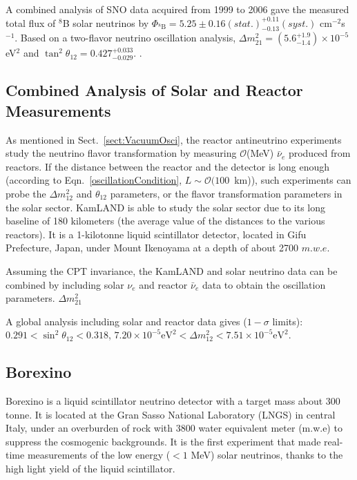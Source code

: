 A combined analysis of SNO data acquired from 1999 to 2006 gave the measured total flux of $^8$B solar neutrinos by $\Phi_{^8\mathrm{B}}=5.25\pm0.16(stat.)^{+0.11}_{-0.13}(syst.)$ cm$^{-2}$s$^{-1}$. Based on a two-flavor neutrino oscillation analysis, $\Delta m^2_{21}=(5.6^{+1.9}_{-1.4})\times 10^{-5}$ eV$^2$ and $\tan^2\theta_{12}=0.427^{+0.033}_{-0.029}$.
\cite{aharmim2013combined}.

\subsection{Combined Analysis of Solar and Reactor Measurements}
As mentioned in Sect.~\ref{sect:VacuumOsci}, the reactor antineutrino experiments study the neutrino flavor transformation by measuring $\mathcal{O}$(MeV) $\bar{\nu}_e$ produced from reactors. If the distance between the reactor and the detector is long enough (according to Eqn.~\ref{oscillationCondition}, $L\sim\mathcal{O}(100$~km)), such experiments can probe the $\Delta m^2_{12}$ and $\theta_{12}$ parameters, or the flavor transformation parameters in the solar sector. KamLAND is able to study the solar sector due to its long baseline of 180 kilometers (the average value of the distances to the various reactors). It is a 1-kilotonne liquid scintillator detector, located in Gifu Prefecture, Japan, under Mount Ikenoyama at a depth of about 2700 $m.w.e$\cite{abe2008precision}. 

Assuming the CPT invariance, the KamLAND and solar neutrino data can be combined by including solar $\nu_e$ and reactor $\bar{\nu}_e$ data to obtain the oscillation parameters.
$\Delta m^2_{21}$

A global analysis including solar and reactor data gives ($1-\sigma$ limits)\cite{oberauer2020solar}:
$0.291<\sin^2\theta_{12}<0.318$,
$7.20\times 10^{-5}\mathrm{eV}^2<\Delta m^2_{12}<7.51\times 10^{-5}\mathrm{eV}^2$.

\subsection{Borexino}
Borexino is a liquid scintillator neutrino detector with a target mass about 300 tonne. It is located at the Gran Sasso National Laboratory (LNGS) in central Italy, under an overburden of rock with 3800 water equivalent meter (m.w.e) to suppress the cosmogenic backgrounds. It is the first experiment that made real-time measurements of the low energy ($<1$ MeV) solar neutrinos, thanks to the high light yield of the liquid scintillator.

